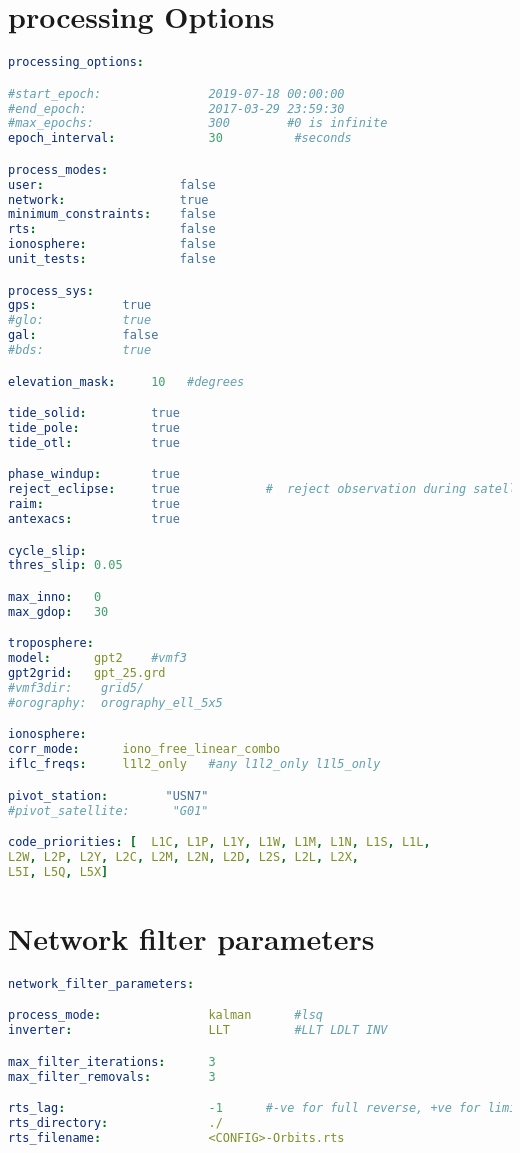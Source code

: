 \section{processing Options}

\begin{lstlisting}[language=yaml,caption=yaml input files configuration example]
processing_options:

#start_epoch:               2019-07-18 00:00:00
#end_epoch:                 2017-03-29 23:59:30
#max_epochs:                300        #0 is infinite
epoch_interval:             30          #seconds

process_modes:
user:                   false
network:                true
minimum_constraints:    false
rts:                    false
ionosphere:             false
unit_tests:             false

process_sys:
gps:            true
#glo:           true
gal:            false
#bds:           true

elevation_mask:     10   #degrees

tide_solid:         true
tide_pole:          true
tide_otl:           true

phase_windup:       true
reject_eclipse:     true            #  reject observation during satellite eclipse periods
raim:               true
antexacs:           true

cycle_slip:
thres_slip: 0.05

max_inno:   0
max_gdop:   30

troposphere:
model:      gpt2    #vmf3
gpt2grid:   gpt_25.grd
#vmf3dir:    grid5/
#orography:  orography_ell_5x5

ionosphere:
corr_mode:      iono_free_linear_combo
iflc_freqs:     l1l2_only   #any l1l2_only l1l5_only

pivot_station:        "USN7"
#pivot_satellite:      "G01"

code_priorities: [  L1C, L1P, L1Y, L1W, L1M, L1N, L1S, L1L,
L2W, L2P, L2Y, L2C, L2M, L2N, L2D, L2S, L2L, L2X,
L5I, L5Q, L5X]
\end{lstlisting}

\section{Network filter parameters}
\begin{lstlisting}[language=yaml,caption=yaml input files configuration example]
network_filter_parameters:

process_mode:               kalman      #lsq
inverter:                   LLT         #LLT LDLT INV

max_filter_iterations:      3
max_filter_removals:        3

rts_lag:                    -1      #-ve for full reverse, +ve for limited epochs
rts_directory:              ./
rts_filename:               <CONFIG>-Orbits.rts
\end{lstlisting}

